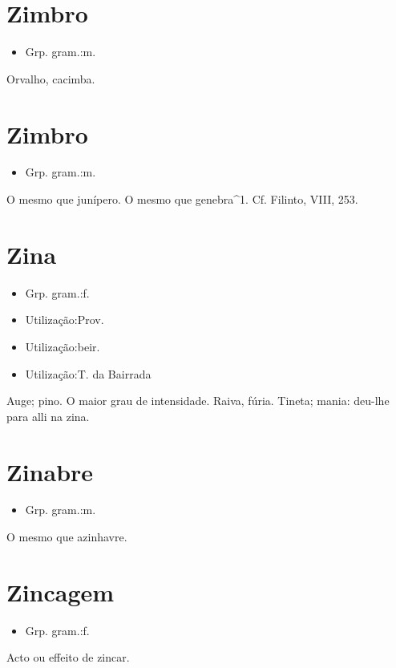 \section{Zimbro}
\begin{itemize}
\item {Grp. gram.:m.}
\end{itemize}
Orvalho, cacimba.
\section{Zimbro}
\begin{itemize}
\item {Grp. gram.:m.}
\end{itemize}
O mesmo que \textunderscore junípero\textunderscore .
O mesmo que \textunderscore genebra\textunderscore ^1. Cf. Filinto, VIII, 253.
\section{Zina}
\begin{itemize}
\item {Grp. gram.:f.}
\end{itemize}
\begin{itemize}
\item {Utilização:Prov.}
\end{itemize}
\begin{itemize}
\item {Utilização:beir.}
\end{itemize}
\begin{itemize}
\item {Utilização:T. da Bairrada}
\end{itemize}
Auge; pino.
O maior grau de intensidade.
Raiva, fúria.
Tineta; mania: \textunderscore deu-lhe para alli na zina\textunderscore .
\section{Zinabre}
\begin{itemize}
\item {Grp. gram.:m.}
\end{itemize}
O mesmo que \textunderscore azinhavre\textunderscore .
\section{Zincagem}
\begin{itemize}
\item {Grp. gram.:f.}
\end{itemize}
Acto ou effeito de \textunderscore zincar\textunderscore .
